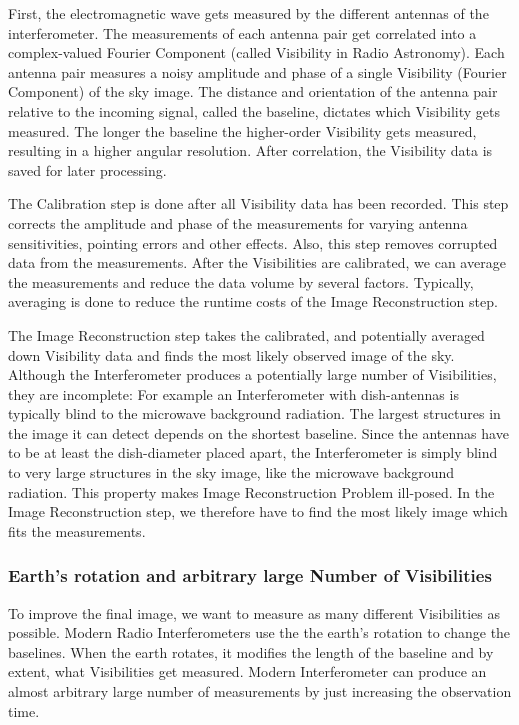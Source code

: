 First, the electromagnetic wave gets measured by the different antennas of the interferometer. The measurements of each antenna pair get correlated into a complex-valued Fourier Component (called Visibility in Radio Astronomy). Each antenna pair measures a noisy amplitude and phase of a single Visibility (Fourier Component) of the sky image. The distance and orientation of the antenna pair relative to the incoming signal, called the baseline, dictates which Visibility gets measured. The longer the baseline the higher-order Visibility gets measured, resulting in a higher angular resolution. After correlation, the Visibility data is saved for later processing.

The Calibration step is done after all Visibility data has been recorded. This step corrects the amplitude and phase of the measurements for varying antenna sensitivities, pointing errors and other effects. Also, this step removes corrupted data from the measurements. After the Visibilities are calibrated, we can average the measurements and reduce the data volume by several factors. Typically, averaging is done to reduce the runtime costs of the Image Reconstruction step.

The Image Reconstruction step takes the calibrated, and potentially averaged down Visibility data and finds the most likely observed image of the sky. Although the Interferometer produces a potentially large number of Visibilities, they are incomplete: For example an Interferometer with dish-antennas is typically blind to the microwave background radiation. The largest structures in the image it can detect depends on the shortest baseline. Since the antennas have to be at least the dish-diameter placed apart, the Interferometer is simply blind to very large structures in the sky image, like the microwave background radiation. This property makes Image Reconstruction Problem ill-posed. In the Image Reconstruction step, we therefore have to find the most likely image which fits the measurements.

\subsubsection{Earth's rotation and arbitrary large Number of Visibilities}
To improve the final image, we want to measure as many different Visibilities as possible. Modern Radio Interferometers use the the earth's rotation to change the baselines. When the earth rotates, it modifies the length of the baseline and by extent, what Visibilities get measured. Modern Interferometer can produce an almost arbitrary large number of measurements by just increasing the observation time.

